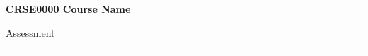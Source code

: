 \documentclass[12pt]{article}
\begin{document}

\begin{center}
  \textbf{CRSE0000 Course Name} \par
  Assessment
  \vspace{1em}
  \hrule
\end{center}
\end{document}
